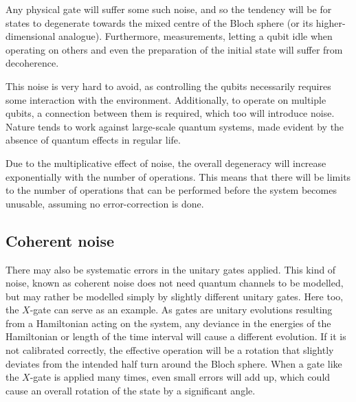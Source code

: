 Any physical gate will suffer some such noise, and so the tendency will be for states to degenerate towards the mixed centre of the Bloch sphere (or its higher-dimensional analogue).
Furthermore, measurements, letting a qubit idle when operating on others and even the preparation of the initial state will suffer from decoherence.

This noise is very hard to avoid, as controlling the qubits necessarily requires some interaction with the environment.
Additionally, to operate on multiple qubits, a connection between them is required, which too will introduce noise.
Nature tends to work against large-scale quantum systems, made evident by the absence of quantum effects in regular life.

Due to the multiplicative effect of noise, the overall degeneracy will increase exponentially with the number of operations.
This means that there will be limits to the number of operations that can be performed before the system becomes unusable, assuming no error-correction is done.

\subsection{Coherent noise}
There may also be systematic errors in the unitary gates applied.
This kind of noise, known as coherent noise does not need quantum channels to be modelled, but may rather be modelled simply by slightly different unitary gates.
Here too, the $X$-gate can serve as an example.
As gates are unitary evolutions resulting from a Hamiltonian acting on the system, any deviance in the energies of the Hamiltonian or length of the time interval will cause a different evolution.
If it is not calibrated correctly, the effective operation will be a rotation that slightly deviates from the intended half turn around the Bloch sphere.
When a gate like the $X$-gate is applied many times, even small errors will add up, which could cause an overall rotation of the state by a significant angle.

